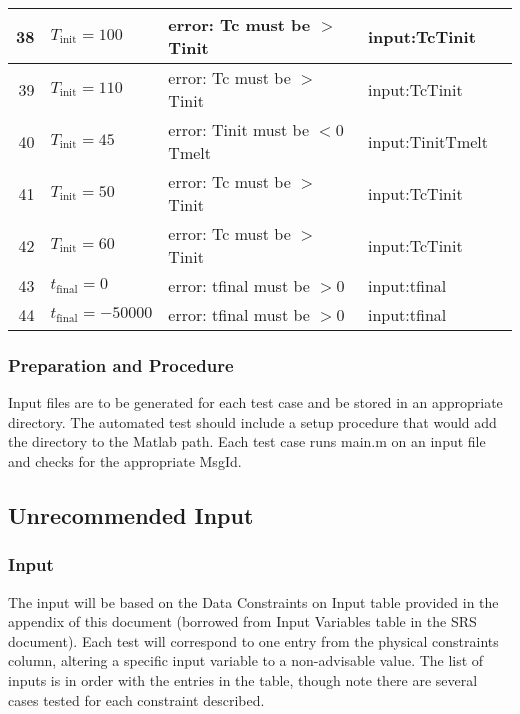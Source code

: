 \documentclass[12pt]{article}
\begin{document}
\begin{center}
\begin{longtable}{ | r | p{4cm} | p{4cm} | p{4cm} | p{4cm} |}
	38 & $T_{\text{init}} = 100$ & error: Tc must be $>$ Tinit & input:TcTinit \\ \hline
	39 & $T_{\text{init}} = 110$ & error: Tc must be $>$ Tinit & input:TcTinit \\ \hline
	40 & $T_{\text{init}} = 45$ &error: Tinit must be $< 0$ Tmelt & input:TinitTmelt \\ \hline
	41 & $T_{\text{init}} = 50$ &error: Tc must be $>$ Tinit & input:TcTinit \\ \hline
	42 & $T_{\text{init}} = 60$ &error: Tc must be $>$ Tinit & input:TcTinit \\ \hline
	43 & $t_{\text{final}} = 0$ &error: tfinal must be $> 0$ &input:tfinal \\ \hline
	44 & $t_{\text{final}} = -50000$ &error: tfinal must be $> 0$ &input:tfinal \\ \hline
	\end{longtable}
\end{center}

\subsubsection{Preparation and Procedure}
Input files are to be generated for each test case and be stored in an appropriate
 directory. The automated test should include a setup procedure that would add 
 the directory to the Matlab path. Each test case runs main.m on an input file
  and checks for the appropriate MsgId. 

\subsection{Unrecommended Input}

\subsubsection{Input}
The input will be based on the Data Constraints on Input table provided 
in the appendix of this document (borrowed from Input Variables table in the SRS document). Each test will correspond to one entry from 
the physical constraints column, altering a specific input variable to a non-advisable
 value. The list of inputs is in order with the entries in the table, though note there are several cases tested for each constraint described.
 
\end{document}
